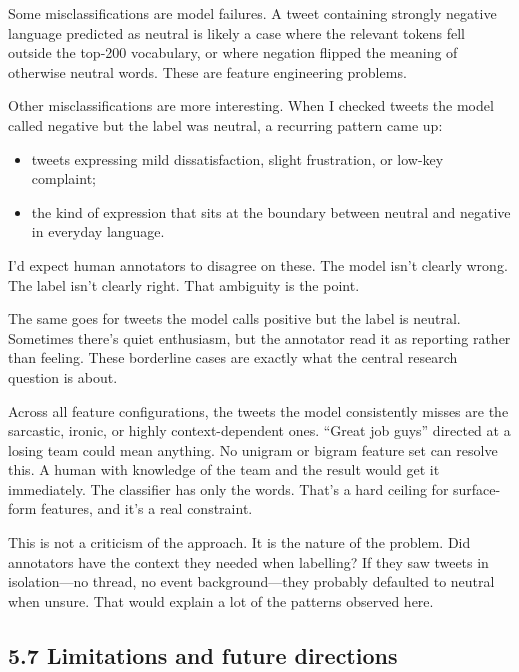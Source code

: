 \documentclass[12pt]{article}
\begin{document}
Some misclassifications are model failures. A tweet containing strongly negative language predicted as neutral is likely a case where the relevant tokens fell outside the top-200 vocabulary, or where negation flipped the meaning of otherwise neutral words. These are feature engineering problems.

Other misclassifications are more interesting. When I checked tweets the model called negative but the label was neutral, a recurring pattern came up:

\begin{itemize}

  \item tweets expressing mild dissatisfaction, slight frustration, or low-key complaint;

  \item the kind of expression that sits at the boundary between neutral and negative in everyday language.

\end{itemize} I'd expect human annotators to disagree on these. The model isn't clearly wrong. The label isn't clearly right. That ambiguity is the point.

The same goes for tweets the model calls positive but the label is neutral. Sometimes there's quiet enthusiasm, but the annotator read it as reporting rather than feeling. These borderline cases are exactly what the central research question is about.

Across all feature configurations, the tweets the model consistently misses are the sarcastic, ironic, or highly context-dependent ones. ``Great job guys'' directed at a losing team could mean anything. No unigram or bigram feature set can resolve this. A human with knowledge of the team and the result would get it immediately. The classifier has only the words. That's a hard ceiling for surface-form features, and it's a real constraint.

This is not a criticism of the approach. It is the nature of the problem. Did annotators have the context they needed when labelling? If they saw tweets in isolation---no thread, no event background---they probably defaulted to neutral when unsure. That would explain a lot of the patterns observed here.



\subsection*{5.7 Limitations and future directions}
\end{document}
